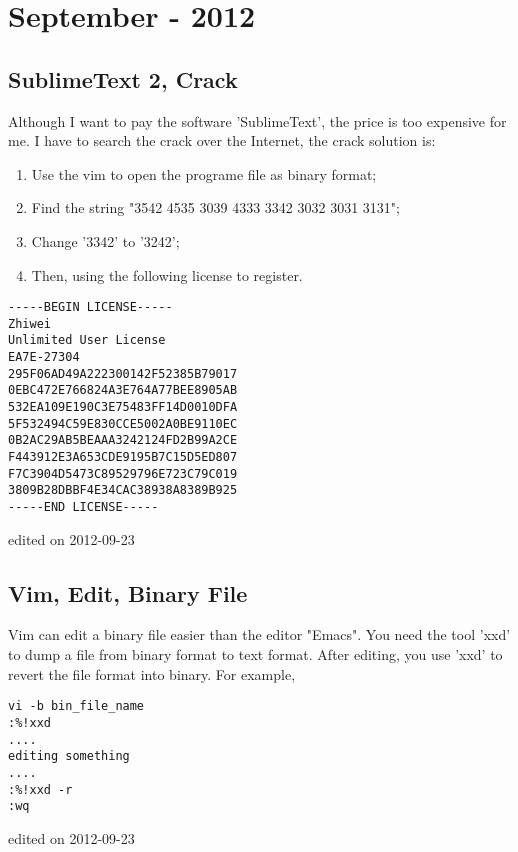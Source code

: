 \chapter{September - 2012} %
\label{ch:sep:2012} %


\section{SublimeText 2, Crack}
Although I want to pay the software 'SublimeText', the price is too expensive for me.
I have to search the crack over the Internet, the crack solution is:
\begin{enumerate}
\item  Use the vim to open the programe file as binary format;
\item  Find the string "3542 4535 3039 4333 3342 3032 3031 3131";
\item  Change '3342' to '3242';
\item  Then, using the following license to register.
\end{enumerate}
\begin{comment}
\end{comment}
\begin{verbatim}
-----BEGIN LICENSE-----
Zhiwei
Unlimited User License
EA7E-27304
295F06AD49A222300142F52385B79017
0EBC472E766824A3E764A77BEE8905AB
532EA109E190C3E75483FF14D0010DFA
5F532494C59E830CCE5002A0BE9110EC
0B2AC29AB5BEAAA3242124FD2B99A2CE
F443912E3A653CDE9195B7C15D5ED807
F7C3904D5473C89529796E723C79C019
3809B28DBBF4E34CAC38938A8389B925
-----END LICENSE-----
\end{verbatim}
\hfill {\tiny edited on 2012-09-23}

\section{Vim, Edit, Binary File}
Vim can edit a binary file easier than the editor "Emacs". 
You need the tool 'xxd' to dump a file from binary format to text format.
After editing, you use 'xxd' to revert the file format into binary. 
For example,

\begin{verbatim}
vi -b bin_file_name
:%!xxd
....
editing something
....
:%!xxd -r
:wq
\end{verbatim}
\hfill {\tiny edited on 2012-09-23}

